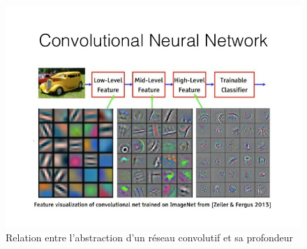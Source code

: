 \begin{figure}
    \centering
    \includegraphics[scale=0.45]{./tex/convolution-network/cnn/convabs.jpg}
    \caption{Relation entre l'abstraction d'un réseau convolutif et sa profondeur}
    \label{absconvpro}
\end{figure}


